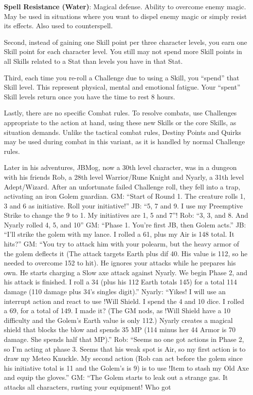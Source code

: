 \textbf{Spell Resistance (Water)}: Magical defense.
Ability to overcome enemy magic. May be used
in situations where you want to dispel enemy
magic or simply resist its effects. Also used to
counterspell.

Second, instead of gaining one Skill point
per three character levels, you earn one Skill
point for each character level. You still may not
spend more Skill points in all Skills related to a
Stat than levels you have in that Stat.

Third, each time you re-roll a Challenge
due to using a Skill, you “spend” that Skill level.
This represent physical, mental and emotional
fatigue. Your “spent” Skill levels return once you
have the time to rest 8 hours.

Lastly, there are no specific Combat rules.
To resolve combats, use Challenges appropriate
to the action at hand, using these new Skills or
the core Skills, as situation demands. Unlike the
tactical combat rules, Destiny Points and Quirks
may be used during combat in this variant, as it
is handled by normal Challenge rules.

Later in his adventures, JBMog, now a 30th level character,
was in a dungeon with his friends Rob, a 28th level
Warrior/Rune Knight and Nyarly, a 31th level
Adept/Wizard. After an unfortunate failed Challenge roll,
they fell into a trap, activating an iron Golem guardian.
GM: “Start of Round 1. The creature rolls 1, 3 and
6 as initiative. Roll your initiative!”
JB: “5, 7 and 9. I use my Preemptive Strike to
change the 9 to 1. My initiatives are 1, 5 and 7”!
Rob: “3, 3, and 8. And Nyarly rolled 4, 5, and 10”
GM: “Phase 1. You're first JB, then Golem acts.”
JB: “I'll strike the golem with my lance. I rolled a
61, plus my Air is 148 total. It hits?”
GM: “You try to attack him with your polearm,
but the heavy armor of the golem deflects it (The attack
targets Earth plus dif 40. His value is 112, so he needed
to overcome 152 to hit). He ignores your attacks while he
prepares his own. He starts charging a Slow axe attack
against Nyarly. We begin Phase 2, and his attack is
finished. I roll a 34 (plus his 112 Earth totals 145) for a
total 114 damage (110 damage plus 34's singles digit).”
Nyarly: “Yikes! I will use an interrupt action and
react to use !Will Shield. I spend the 4 and 10 dice. I
rolled a 69, for a total of 149. I made it? (The GM nods,
as !Will Shield have a 10 difficulty and the Golem's Earth
value is only 112.) Nyarly creates a magical shield that
blocks the blow and spends 35 MP (114 minus her 44
Armor is 70 damage. She spends half that MP).”
Rob: “Seems no one got actions in Phase 2, so I'm
acting at phase 3. Seems that his weak spot is Air, so my
first action is to draw my Meteo Knuckle. My second
action (Rob can act before the golem since his initiative
total is 11 and the Golem's is 9) is to use !Item to stash
my Old Axe and equip the gloves.”
GM: “The Golem starts to leak out a strange gas.
It attacks all characters, rusting your equipment! Who got

